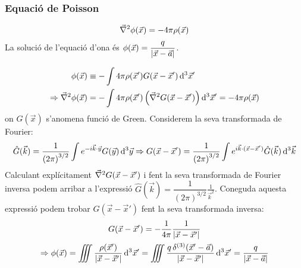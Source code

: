 \subsubsection*{Equació de Poisson}
\begin{defi}
    \begin{align}
        \vec{\nabla}^{2} \phi(\vec{x}) = - 4 \pi \rho(\vec{x})
    \end{align}
    La solució de l'equació d'ona és $\phi(\vec{x}) = \dfrac{q}{\left| \vec{x} - \vec{a} \right|}$.
\end{defi}
\begin{sproof}
    \begin{align*}
    \begin{aligned}
        \phi(\vec{x}) &\equiv - \int 4\pi \rho(\vec{x}') G(\vec{x} - \vec{x}') \mathop{}\!\mathrm{d}^{3} \vec{x}' \\
        \Rightarrow \vec{\nabla}^{2} \phi(\vec{x}) & = - \int 4\pi \rho(\vec{x}') \left( \vec{\nabla}^{2} G(\vec{x} - \vec{x}') \right) \mathop{}\!\mathrm{d}^{3} \vec{x}' = - 4 \pi \rho(\vec{x})
    \end{aligned}
    \end{align*}
    on $G(\vec{x})$ s'anomena funció de Green. Considerem la seva transformada de Fourier:
    \begin{align*}
        \hat{G}(\vec{k}) = \frac{1}{\left( 2\pi \right)^{3/2}} \int e^{-i \vec{k}\cdot \vec{y}} G(\vec{y}) \mathop{}\!\mathrm{d}^{3} \vec{y} \Rightarrow G(\vec{x} - \vec{x}') = \frac{1}{\left( 2\pi \right)^{3/2}} \int e^{i \vec{k}\cdot (\vec{x} - \vec{x}')} \hat{G}(\vec{k}) \mathop{}\!\mathrm{d}^{3} \vec{k}
    \end{align*}
    Calculant explícitament $\vec{\nabla}^{2} G(\vec{x} - \vec{x}')$ i fent la seva transformada de Fourier inversa podem arribar a l'expressió $\hat{G}(\vec{k}) = \dfrac{1}{(2\pi)^{3/2}} \frac{1}{\vec{k}^{2}}$. Coneguda aquesta expressió podem trobar $G(\vec{x} - \vec{x}')$ fent la seva transformada inversa:
    \begin{align*}
    \begin{gathered}
        G(\vec{x} - \vec{x}') = - \frac{1}{4\pi} \frac{1}{\left| \vec{x} - \vec{x}' \right|} \\
        \Rightarrow \phi(\vec{x}) = \iiint \frac{\rho(\vec{x}')}{\left| \vec{x} - \vec{x}' \right|} \mathop{}\!\mathrm{d}^{3} \vec{x}' =  \iiint \frac{q \, \delta^{(3)} (\vec{x}' - \vec{a})}{\left| \vec{x} - \vec{x}' \right|} \mathop{}\!\mathrm{d}^{3} \vec{x}' = \frac{q}{\left| \vec{x} - \vec{a} \right|}
        \end{gathered}
    \end{align*}
\end{sproof}

